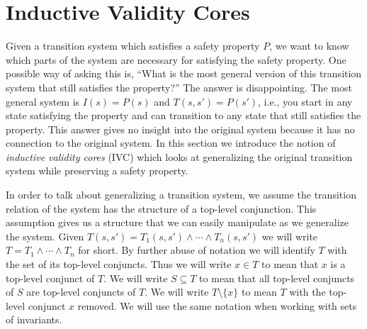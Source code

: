 \section{Inductive Validity Cores}
\label{sec:ivc}

\newcommand{\bfalg}{IVC\_BF\xspace}
\newcommand{\ucalg}{IVC\_UC\xspace}
\newcommand{\ucbfalg}{IVC\_UCBF\xspace}
\newcommand{\bq}{\textsc{BaseQuery}\xspace}
\newcommand{\iq}{\textsc{IndQuery}\xspace}
\newcommand{\fq}{\textsc{FullQuery}\xspace}

\newcommand{\mink}{\textsc{MinimizeK}\xspace}
\newcommand{\reduceinv}{\textsc{ReduceInvariants}\xspace}
\newcommand{\minivc}{\textsc{MinimizeIvc}\xspace}

\newcommand{\checksat}{\textsc{CheckSat}\xspace}
\newcommand{\unsatcore}{\textsc{UnsatCore}\xspace}
\newcommand{\unsat}{\textsc{UNSAT}\xspace}
\newcommand{\sat}{\textsc{SAT}\xspace}

Given a transition system which satisfies a safety property $P$, we
want to know which parts of the system are necessary for satisfying
the safety property. One possible way of asking this is, ``What is the
most general version of this transition system that still satisfies
the property?'' The answer is disappointing. The most general system is
$I(s) = P(s)$ and $T(s, s') = P(s')$, i.e., you start in any state
satisfying the property and can transition to any state that still
satisfies the property. This answer gives no insight into the original
system because it has no connection to the original system. In this
section we introduce the notion of {\em inductive validity cores} (IVC)
which looks at generalizing the original transition system while
preserving a safety property.

In order to talk about generalizing a transition system, we assume the
transition relation of the system has the structure of a top-level
conjunction. This assumption gives us a structure that we can easily
manipulate as we generalize the system. Given $T(s, s') = T_1(s, s')
\land \cdots \land T_n(s, s')$ we will write $T = T_1 \land \cdots
\land T_n$ for short. By further abuse of notation we will identify
$T$ with the set of its top-level conjuncts. Thus we will write $x \in
T$ to mean that $x$ is a top-level conjunct of $T$. We will write $S
\subseteq T$ to mean that all top-level conjuncts of $S$ are top-level
conjuncts of $T$. We will write $T \setminus \{x\}$ to mean $T$
with the top-level conjunct $x$ removed. We will use the same notation
when working with sets of invariants.

